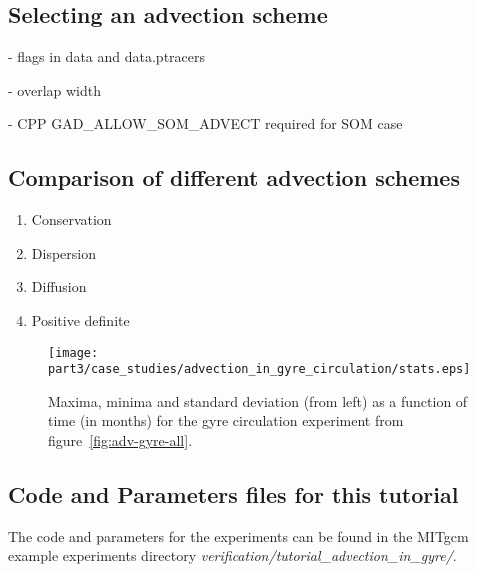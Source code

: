 \subsection{Selecting an advection scheme}

- flags in data and data.ptracers

- overlap width

- CPP GAD\_ALLOW\_SOM\_ADVECT required for SOM case

\subsection{Comparison of different advection schemes}

\begin{enumerate}
\item{Conservation}
\item{Dispersion}
\item{Diffusion}
\item{Positive definite}
\end{enumerate}



\begin{figure}
\begin{center}
 \texttt{[image: part3/case\_studies/advection\_in\_gyre\_circulation/stats.eps]}
\end{center}
\caption{Maxima, minima and standard deviation (from left) as a function of time (in months)
for the gyre circulation experiment from figure~\ref{fig:adv-gyre-all}.}
\label{fig:adv-gyre-stats}
\end{figure}

\subsection{Code and Parameters files for this tutorial}

The code and parameters for the experiments can be found in the MITgcm example experiments 
directory {\it verification/tutorial\_advection\_in\_gyre/}.







